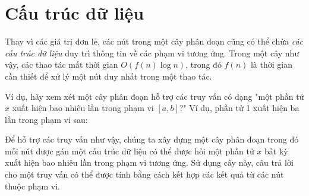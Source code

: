 \section{Cấu trúc dữ liệu}

Thay vì các giá trị đơn lẻ, các nút trong một cây phân đoạn
cũng có thể chứa \emph{các cấu trúc dữ liệu} duy trì thông tin
về các phạm vi tương ứng.
Trong một cây như vậy, các thao tác mất
thời gian $O(f(n) \log n)$, trong đó $f(n)$ là
thời gian cần thiết để xử lý một nút duy nhất trong một thao tác.

Ví dụ, hãy xem xét một cây phân đoạn
hỗ trợ các truy vấn có dạng
"một phần tử $x$ xuất hiện bao nhiêu lần
trong phạm vi $[a,b]$?"
Ví dụ, phần tử 1 xuất hiện ba lần
trong phạm vi sau:

\begin{center}
\end{center}

Để hỗ trợ các truy vấn như vậy, chúng ta xây dựng một cây phân đoạn
trong đó mỗi nút được gán một cấu trúc dữ liệu
có thể được hỏi một phần tử $x$ bất kỳ xuất hiện bao nhiêu lần
trong phạm vi tương ứng.
Sử dụng cây này,
câu trả lời cho một truy vấn có thể được tính
bằng cách kết hợp các kết quả từ các nút
thuộc phạm vi.

